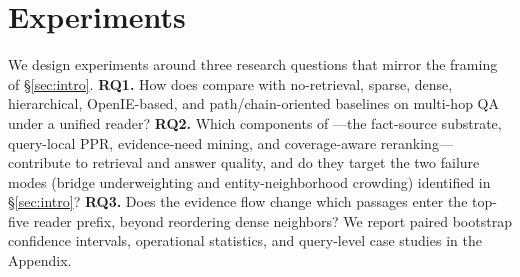 %
%
%

\section{Experiments}
\label{sec:experiments}

We design experiments around three research questions that mirror the
framing of \S\ref{sec:intro}. \textbf{RQ1.} How does \methodname{}
compare with no-retrieval, sparse, dense, hierarchical, OpenIE-based,
and path/chain-oriented baselines on multi-hop QA under a unified reader?
\textbf{RQ2.} Which components of \methodname{}---the fact-source
substrate, query-local PPR, evidence-need mining, and
coverage-aware reranking---contribute to retrieval and answer quality,
and do they target the two failure modes (bridge underweighting and
entity-neighborhood crowding) identified in \S\ref{sec:intro}?
\textbf{RQ3.} Does the evidence flow change which passages enter the
top-five reader prefix, beyond reordering dense neighbors? We report
paired bootstrap confidence intervals, operational statistics, and
query-level case studies in the Appendix.

